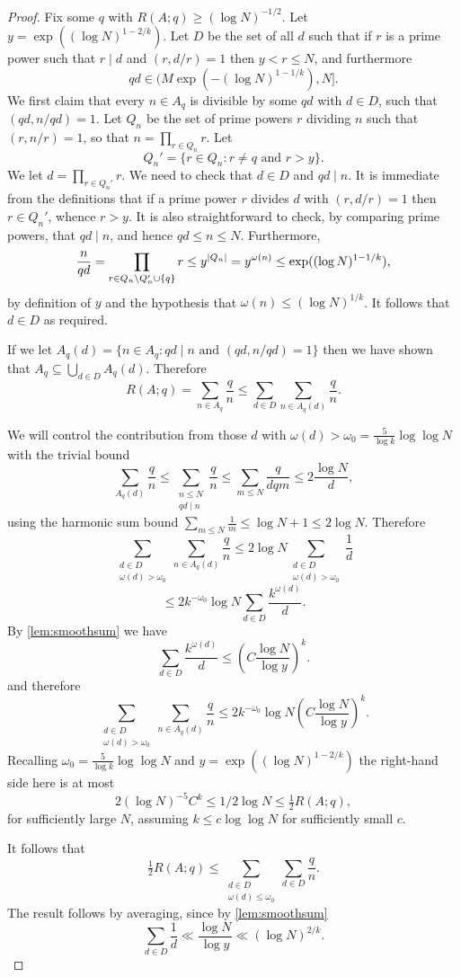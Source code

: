 \begin{proof}
  \leanok
Fix some $q$ with $R(A;q)\geq (\log N)^{-1/2}$. Let $y=\exp((\log N)^{1-2/k})$. Let $D$ be the set of all $d$ such that if $r$ is a prime power such that $r\mid d$ and $(r,d/r)=1$ then $y<r\leq N$, and furthermore
\[qd\in (M\exp(-(\log N)^{1-1/k}),N].\]
We first claim that every $n\in A_q$ is divisible by some $qd$ with $d\in D$, such that $(qd,n/qd)=1$. Let $Q_n$ be the set of prime powers $r$ dividing $n$ such that $(r,n/r)=1$, so that $n=\prod_{r\in Q_n}r$. Let
\[Q_n'=\{ r\in Q_n: r\neq q\textrm{ and }r>y\}.\]
We let $d=\prod_{r\in Q_n'}r$. We need to check that $d\in D$ and $qd\mid n$. It is immediate from the definitions that if a prime power $r$ divides $d$ with $(r,d/r)=1$ then $r\in Q_n'$, whence $r>y$. It is also straightforward to check, by comparing prime powers, that $qd\mid n$, and hence $qd\leq n\leq N$. Furthermore,
\[\frac{n}{qd}=\prod_{r\in Q_n\backslash Q_n'\cup\{q\}}r\leq y^{\left\lvert Q_n\right\rvert}=y^{\omega(n)}\leq \exp((\log N)^{1-1/k}),\]
by definition of $y$ and the hypothesis that $\omega(n)\leq (\log N)^{1/k}$. It follows that $d\in D$ as required.

If we let $A_q(d)=\{ n \in A_q : qd\mid n\textrm{ and }(qd,n/qd)=1\}$ then we have shown that $A_q\subseteq \bigcup_{d\in D}A_q(d)$. Therefore
\[R(A;q) = \sum_{n\in A_q}\frac{q}{n}\leq \sum_{d\in D}\sum_{n\in A_q(d)}\frac{q}{n}.\]

We will control the contribution from those $d$ with $\omega(d)>\omega_0= \frac{5}{\log k}\log\log N$ with the trivial bound
\[\sum_{A_q(d)}\frac{q}{n} \leq \sum_{\substack{n\leq N\\ qd\mid n}}\frac{q}{n}\leq \sum_{m\leq N}\frac{q}{dqm}\leq 2\frac{\log N}{d},\]
using the harmonic sum bound $\sum_{m\leq N}\frac{1}{m}\leq \log N+1\leq 2\log N$.
Therefore
\[
\sum_{\substack{d\in D\\ \omega(d)>\omega_0}}\sum_{n\in A_q(d)}\frac{q}{n}
\leq 2\log N\sum_{\substack{d\in D\\ \omega(d)> \omega_0}} \frac{1}{d}\]
\[\leq 2k^{-\omega_0}\log N\sum_{d\in D} \frac{k^{\omega(d)}}{d}.\]
By \ref{lem:smoothsum} we have
\[\sum_{d\in D}\frac{k^{\omega(d)}}{d}\leq \left(C\frac{\log N}{\log y}\right)^k.\]
and therefore
\[\sum_{\substack{d\in D\\ \omega(d)>\omega_0}}\sum_{n\in A_q(d)}\frac{q}{n}\leq 2k^{-\omega_0}\log N \left(C\frac{\log N}{\log y}\right)^k.\]
Recalling $\omega_0=\frac{5}{\log k}\log\log N$ and  $y=\exp((\log N)^{1-2/k})$ the right-hand side here is at most
\[2(\log N)^{-5}C^k\leq 1/2\log N\leq \tfrac{1}{2}R(A;q),\]
for sufficiently large $N$, assuming $k\leq c\log\log N$ for sufficiently small $c$.

It follows that
\[\tfrac{1}{2}R(A;q)\leq \sum_{\substack{d\in D\\ \omega(d)\leq \omega_0}}\sum_{d\in D}\frac{q}{n} .\]
The result follows by averaging, since by \ref{lem:smoothsum}
\[\sum_{d\in D}\frac{1}{d} \ll \frac{\log N}{\log y}\ll (\log N)^{2/k}.\]
\end{proof}

